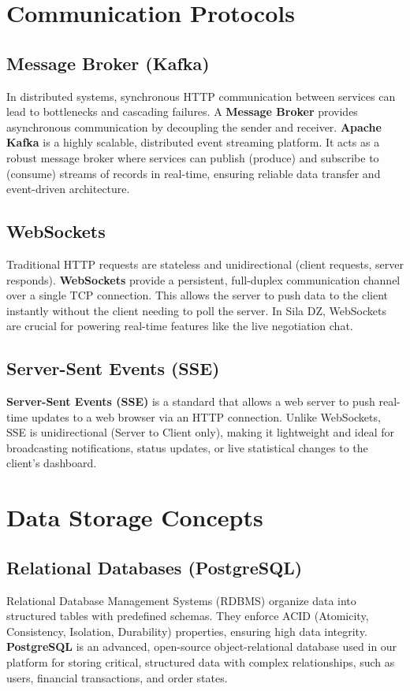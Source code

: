 \section{Communication Protocols}

\subsection{Message Broker (Kafka)}
In distributed systems, synchronous HTTP communication between services can lead to bottlenecks and cascading failures. A \textbf{Message Broker} provides asynchronous communication by decoupling the sender and receiver. \textbf{Apache Kafka} is a highly scalable, distributed event streaming platform. It acts as a robust message broker where services can publish (produce) and subscribe to (consume) streams of records in real-time, ensuring reliable data transfer and event-driven architecture.

\subsection{WebSockets}
Traditional HTTP requests are stateless and unidirectional (client requests, server responds). \textbf{WebSockets} provide a persistent, full-duplex communication channel over a single TCP connection. This allows the server to push data to the client instantly without the client needing to poll the server. In Sila DZ, WebSockets are crucial for powering real-time features like the live negotiation chat.

\subsection{Server-Sent Events (SSE)}
\textbf{Server-Sent Events (SSE)} is a standard that allows a web server to push real-time updates to a web browser via an HTTP connection. Unlike WebSockets, SSE is unidirectional (Server to Client only), making it lightweight and ideal for broadcasting notifications, status updates, or live statistical changes to the client's dashboard.

\section{Data Storage Concepts}

\subsection{Relational Databases (PostgreSQL)}
Relational Database Management Systems (RDBMS) organize data into structured tables with predefined schemas. They enforce ACID (Atomicity, Consistency, Isolation, Durability) properties, ensuring high data integrity. \textbf{PostgreSQL} is an advanced, open-source object-relational database used in our platform for storing critical, structured data with complex relationships, such as users, financial transactions, and order states.

